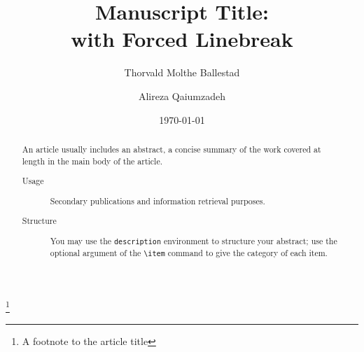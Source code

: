 \documentclass[%
 reprint,
 amsmath,amssymb,
 aps,
]{revtex4-2}
\begin{document}

\title{Manuscript Title:\\with Forced Linebreak}%
\thanks{A footnote to the article title}%

\author{Thorvald Molthe Ballestad}
\author{Alireza Qaiumzadeh}%
%




\date{\today}%

\begin{abstract}
An article usually includes an abstract, a concise summary of the work
covered at length in the main body of the article. 
\begin{description}
\item[Usage]
Secondary publications and information retrieval purposes.
\item[Structure]
You may use the \texttt{description} environment to structure your abstract;
use the optional argument of the \verb+\item+ command to give the category of each item. 
\end{description}
\end{abstract}

\maketitle
\end{document}
